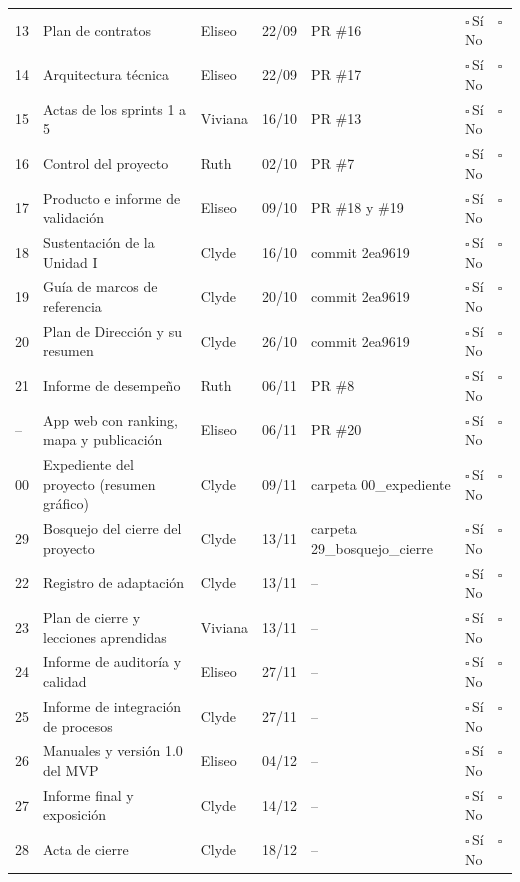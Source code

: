 \documentclass[11pt,a4paper]{article}
\newcommand{\marca}{{\Large$\square$}\,{\scriptsize Sí}\ \ {\Large$\square$}\,{\scriptsize No}}
\begin{document}
{\begin{longtable}{@{}C{0.8cm} >{\raggedright\arraybackslash}p{5.3cm} P{1.6cm} C{1.5cm} P{3.2cm} C{2.0cm}@{}}
13 & Plan de contratos & Eliseo & 22/09 & PR \#16 & \marca \\
14 & Arquitectura técnica & Eliseo & 22/09 & PR \#17 & \marca \\
15 & Actas de los sprints 1 a 5 & Viviana & 16/10 & PR \#13 & \marca \\
16 & Control del proyecto & Ruth & 02/10 & PR \#7 & \marca \\
17 & Producto e informe de validación & Eliseo & 09/10 & PR \#18 y \#19 & \marca \\
18 & Sustentación de la Unidad I & Clyde & 16/10 & commit 2ea9619 & \marca \\
19 & Guía de marcos de referencia & Clyde & 20/10 & commit 2ea9619 & \marca \\
20 & Plan de Dirección y su resumen & Clyde & 26/10 & commit 2ea9619 & \marca \\
21 & Informe de desempeño & Ruth & 06/11 & PR \#8 & \marca \\
-- & App web con ranking, mapa y publicación & Eliseo & 06/11 & PR \#20 & \marca \\
00 & Expediente del proyecto (resumen gráfico) & Clyde & 09/11 & carpeta 00\_expediente & \marca \\
29 & Bosquejo del cierre del proyecto & Clyde & 13/11 & carpeta 29\_bosquejo\_cierre & \marca \\
22 & Registro de adaptación & Clyde & 13/11 & -- & \marca \\
23 & Plan de cierre y lecciones aprendidas & Viviana & 13/11 & -- & \marca \\
24 & Informe de auditoría y calidad & Eliseo & 27/11 & -- & \marca \\
25 & Informe de integración de procesos & Clyde & 27/11 & -- & \marca \\
26 & Manuales y versión 1.0 del MVP & Eliseo & 04/12 & -- & \marca \\
27 & Informe final y exposición & Clyde & 14/12 & -- & \marca \\
28 & Acta de cierre & Clyde & 18/12 & -- & \marca \\
\bottomrule
\end{longtable}
}

\end{document}
